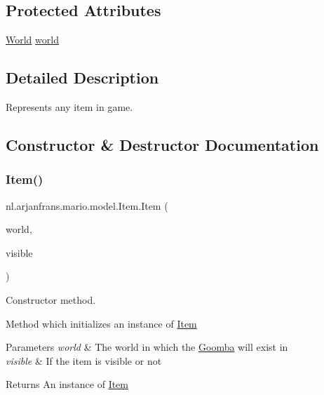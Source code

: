 \subsection*{Protected Attributes}
\begin{DoxyCompactItemize}
\item 
\hyperlink{classnl_1_1arjanfrans_1_1mario_1_1model_1_1World}{World} \hyperlink{classnl_1_1arjanfrans_1_1mario_1_1model_1_1Item_ae5d6d1a768987daac29679cf194ee95d}{world}
\end{DoxyCompactItemize}


\subsection{Detailed Description}
Represents any item in game. 

\subsection{Constructor \& Destructor Documentation}
\mbox{\label{classnl_1_1arjanfrans_1_1mario_1_1model_1_1Item_ae2c1344d50ddfa3e22fca0f1afa7f31f}} 
\subsubsection{\texorpdfstring{Item()}{Item()}}
{\footnotesize\ttfamily nl.\+arjanfrans.\+mario.\+model.\+Item.\+Item (\begin{DoxyParamCaption}\item[{\hyperlink{classnl_1_1arjanfrans_1_1mario_1_1model_1_1World}{World}}]{world,  }\item[{boolean}]{visible }\end{DoxyParamCaption})}



Constructor method. 

Method which initializes an instance of \hyperlink{classnl_1_1arjanfrans_1_1mario_1_1model_1_1Item}{Item} 
\begin{DoxyParams}{Parameters}
{\em world} & The world in which the \hyperlink{classnl_1_1arjanfrans_1_1mario_1_1model_1_1Goomba}{Goomba} will exist in \\
\hline
{\em visible} & If the item is visible or not \\
\hline
\end{DoxyParams}
\begin{DoxyReturn}{Returns}
An instance of \hyperlink{classnl_1_1arjanfrans_1_1mario_1_1model_1_1Item}{Item} 
\end{DoxyReturn}


